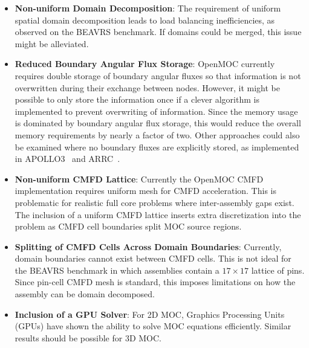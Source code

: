 \begin{itemize}
	\item \textbf{Non-uniform Domain Decomposition}: The requirement of uniform spatial domain decomposition leads to load balancing inefficiencies, as observed on the BEAVRS benchmark. If domains could be merged, this issue might be alleviated.
	
	\item \textbf{Reduced Boundary Angular Flux Storage}: OpenMOC currently requires double storage of boundary angular fluxes so that information is not overwritten during their exchange between nodes. However, it might be possible to only store the information once if a clever algorithm is implemented to prevent overwriting of information. Since the memory usage is dominated by boundary angular flux storage, this would reduce the overall memory requirements by nearly a factor of two. Other approaches could also be examined where no boundary fluxes are explicitly stored, as implemented in APOLLO3~\cite{apollo3_exp} and ARRC~\cite{trrm_new}.
	
	\item \textbf{Non-uniform \ac{CMFD} Lattice}: Currently the OpenMOC \ac{CMFD} implementation requires uniform mesh for \ac{CMFD} acceleration. This is problematic for realistic full core problems where inter-assembly gaps exist. The inclusion of a uniform \ac{CMFD} lattice inserts extra discretization into the problem as \ac{CMFD} cell boundaries split \ac{MOC} source regions.
	
	\item \textbf{Splitting of \ac{CMFD} Cells Across Domain Boundaries}: Currently, domain boundaries cannot exist between \ac{CMFD} cells. This is not ideal for the BEAVRS benchmark in which assemblies contain a $17 \times 17$ lattice of pins. Since pin-cell \ac{CMFD} mesh is standard, this imposes limitations on how the assembly can be domain decomposed. 
	
	
	
	\item \textbf{Inclusion of a GPU Solver}: For 2D \ac{MOC}, Graphics Processing Units (GPUs) have shown the ability to solve \ac{MOC} equations efficiently. Similar results should be possible for 3D \ac{MOC}. 
\end{itemize}


